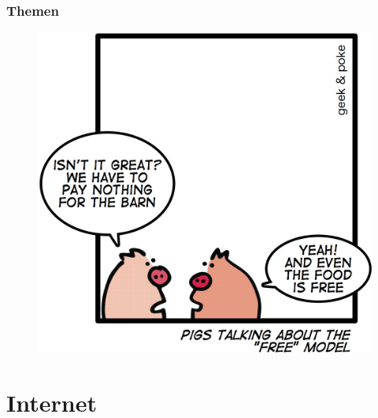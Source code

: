\documentclass[12pt, table]{beamer}
\begin{document}
\begin{frame}
  \frametitle{Themen}
  \begin{figure}
    \includegraphics[height=0.7\textheight]{../img/business_pigs.jpg}
  \end{figure}
\end{frame}

\section{Internet}
  \subsection{}
\end{document}
